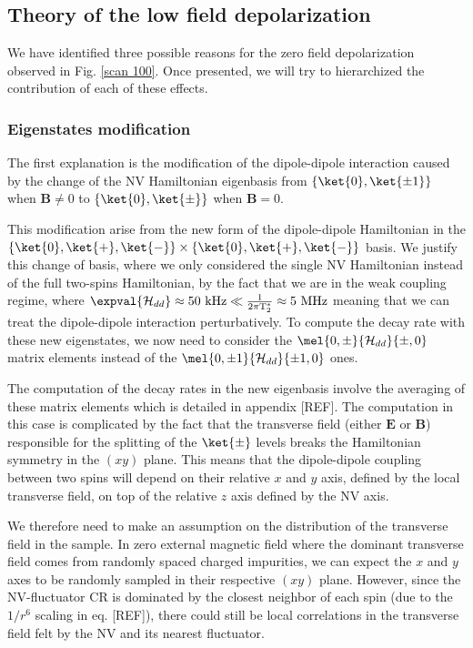 \documentclass[a4paper,11pt]{report}
\begin{document}
\begin{refsection}
\subsection{Theory of the low field depolarization}
\label{sec causes zero field}
We have identified three possible reasons for the zero field depolarization observed in Fig. \ref{scan 100}. Once presented, we will try to hierarchized the contribution of each of these effects.

\subsubsection{Eigenstates modification}
The first explanation is the modification of the dipole-dipole interaction caused by the change of the NV Hamiltonian eigenbasis from $\{ \ket{0}, \ket{\pm 1} \}$ when $\mathbf{B} \neq 0$ to $\{ \ket{0}, \ket{\pm} \}$ when $\mathbf{B} = 0$.

This modification arise from the new form of the dipole-dipole Hamiltonian in the $\{ \ket{0}, \ket{+}, \ket{-} \} \times \{ \ket{0}, \ket{+}, \ket{-} \}$ basis. We justify this change of basis, where we only considered the single NV Hamiltonian instead of the full two-spins Hamiltonian, by the fact that we are in the weak coupling regime, where $\expval{\mathcal{H}_{dd}} \approx 50\ \rm kHz \ll \frac{1}{2\pi T_2^*} \approx 5\ \rm MHz$ meaning that we can treat the dipole-dipole interaction perturbatively. To compute the decay rate with these new eigenstates, we now need to consider the $\mel{0,\pm}{\mathcal{H}_{dd}}{\pm ,0}$ matrix elements instead of the $\mel{0,\pm 1}{\mathcal{H}_{dd}}{\pm 1,0}$ ones.

The computation of the decay rates in the new eigenbasis involve the averaging of these matrix elements which is detailed in appendix [REF]. The computation in this case is complicated by the fact that the transverse field (either $\mathbf{E}$ or $\mathbf{B}$) responsible for the splitting of the $\ket{\pm}$ levels breaks the Hamiltonian symmetry in the $(xy)$ plane. This means that the dipole-dipole coupling between two spins will depend on their relative $x$ and $y$ axis, defined by the local transverse field, on top of the relative $z$ axis defined by the NV axis. 

We therefore need to make an assumption on the distribution of the transverse field in the sample. In zero external magnetic field where the dominant transverse field comes from randomly spaced charged impurities, we can expect the $x$ and $y$ axes to be randomly sampled in their respective $(xy)$ plane. However, since the NV-fluctuator CR is dominated by the closest neighbor of each spin (due to the $1/r^6$ scaling in eq. [REF]), there could still be local correlations in the transverse field felt by the NV and its nearest fluctuator.


\end{refsection}
\end{document}
